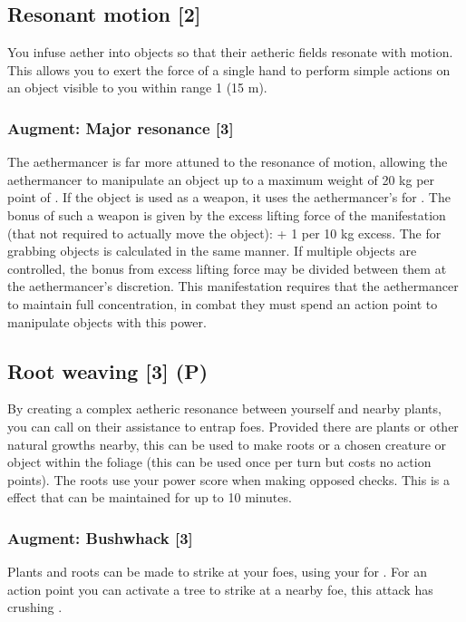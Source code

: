 \subsection{Resonant motion [2]}
\label{spell:min-tele}
You infuse aether into objects so that their aetheric fields resonate with motion. This allows you to exert the force of a single hand to perform simple actions on an object visible to you within range 1 (15 m).
\subsubsection{Augment: Major resonance [3]}
The aethermancer is far more attuned to the resonance of motion, allowing the aethermancer to manipulate an object up to a maximum weight of 20 kg per point of . If the object is used as a weapon, it uses the aethermancer's  for . The bonus  of such a weapon is given by the excess lifting force of the manifestation (that not required to actually move the object):  + 1 per 10 kg excess. The  for grabbing objects is calculated in the same manner. If multiple objects are controlled, the  bonus from excess lifting force may be divided between them at the aethermancer's discretion. This manifestation requires that the aethermancer to maintain full concentration, in combat they must spend an action point to manipulate objects with this power.


\subsection{Root weaving [3] (P)}
By creating a complex aetheric resonance between yourself and nearby plants, you can call on their assistance to entrap foes. Provided there are plants or other natural growths nearby, this can be used to make roots  or  a chosen creature or object within the foliage (this can be used once per turn but costs no action points). The roots use your  power score when making opposed checks. This is a  effect that can be maintained for up to 10 minutes.
\subsubsection{Augment: Bushwhack [3]}
Plants and roots can be made to strike at your foes, using your  for . For an action point you can activate a tree to strike at a nearby foe, this attack has crushing .



